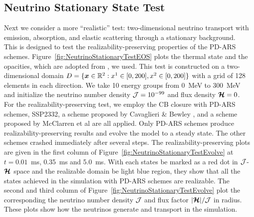 \subsection{Neutrino Stationary State Test} \label{se: Neutrino Stationary State Test}
Next we consider a more ``realistic'' test: two-dimensional neutrino transport with emission, absorption, and elastic scattering through a stationary background.
This is designed to test the realizability-preserving properties of the PD-ARS schemes.
Figure~\ref{fig:NeutrinoStationaryTestEOS} plots the thermal state and the opacities, which are adopted from \cite{Bruenn_1985}, we used.
This test is constructed on a two-dimensional domain $D=\{\boldsymbol{x}\in\mathbb{R}^{2}:x^{1}\in[0,200], x^{2}\in[0,200]\}$ with a grid of 128 elements in each direction.
We take 10 energy groups from 0~MeV to 300~MeV and initialize the neutrino number density $\mathcal{J} = 10^{-99}$ and flux density $\boldsymbol{\mathcal{H}}=0$.
For the realizability-preserving test, we employ the CB closure with PD-ARS schemes, SSP2332, a scheme proposed by Cavaglieri \& Bewley \cite{cavaglieriBewley2015}, and a scheme proposed by McClarren et al \cite{mcclarren_etal_2008} are all applied.
Only PD-ARS schemes produce realizability-preserving results and evolve the model to a steady state.
The other schemes crashed immediately after several steps.
The realizability-preserving plots are given in the first column of Figure~\ref{fig:NeutrinoStationaryTestEvolve} at $t=0.01$~ms, 0.35~ms and 5.0~ms.
With each states be marked as a red dot in $\mathcal{J}$-$\boldsymbol{\mathcal{H}}$ space and the realizable domain be light blue region, they show that all the states achieved in the simulation with PD-ARS schemes are realizable.
The second and third column of Figure~\ref{fig:NeutrinoStationaryTestEvolve} plot the corresponding the neutrino number density $\mathcal{J}$ and flux factor $|\boldsymbol{\mathcal{H}}|/\mathcal{J}$ in radius.
These plots show how the neutrinos generate and transport in the simulation.

